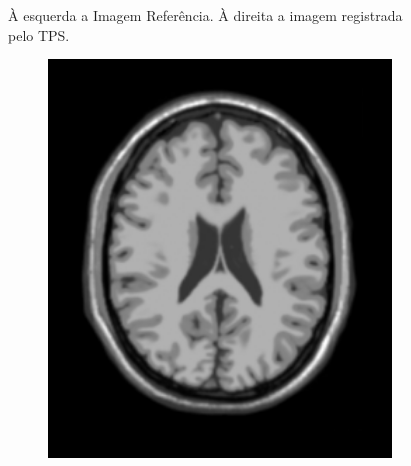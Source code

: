 \documentclass[t]{beamer}
\begin{document}
\begin{frame}
\begin{figure}[H]
\begin{subfigure}[b]{0.49\textwidth}
    \end{subfigure}
    \caption{À esquerda a Imagem Referência. À direita a imagem registrada pelo TPS.}
  \end{figure}
\end{frame}

\begin{frame}
  \begin{figure}[H]
    \centering
    \begin{subfigure}[b]{0.49\textwidth}
      \includegraphics[width=1\textwidth]{figuras/screen.png}
    \end{subfigure}
    \begin{subfigure}[b]{0.49\textwidth}

\end{subfigure}
\end{figure}
\end{frame}
\end{document}
